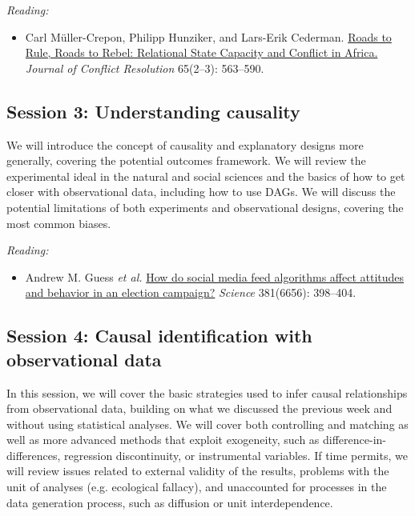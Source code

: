 \documentclass[12pt, a4paper]{article}
\begin{document}
\vspace{15pt}\noindent\textit{Reading:}

\begin{itemize}
  \item Carl Müller-Crepon, Philipp Hunziker, and Lars-Erik Cederman. \href{https://journals.sagepub.com/doi/10.1177/0022002720963674}{Roads to Rule, Roads to Rebel: Relational State Capacity and Conflict in Africa.} \textit{Journal of Conflict Resolution} 65(2--3): 563--590.
\end{itemize}

\subsection*{Session 3: Understanding causality}

We will introduce the concept of causality and explanatory designs more generally, covering the potential outcomes framework. We will review the experimental ideal in the natural and social sciences and the basics of how to get closer with observational data, including how to use DAGs. We will discuss the potential limitations of both experiments and observational designs, covering the most common biases.

\vspace{15pt}\noindent\textit{Reading:}

\begin{itemize}
  \item Andrew M. Guess \textit{et al.} \href{https://www.science.org/doi/10.1126/science.abp9364}{How do social media feed algorithms affect attitudes and behavior in an election campaign?} \textit{Science} 381(6656): 398--404.
\end{itemize}


\subsection*{Session 4: Causal identification with observational data}

In this session, we will cover the basic strategies used to infer causal relationships from observational data, building on what we discussed the previous week and without using statistical analyses. We will cover both controlling and matching as well as more advanced methods that exploit exogeneity, such as difference-in-differences, regression discontinuity, or instrumental variables. If time permits, we will review issues related to external validity of the results, problems with the unit of analyses (e.g. ecological fallacy), and unaccounted for processes in the data generation process, such as diffusion or unit interdependence.
\end{document}
